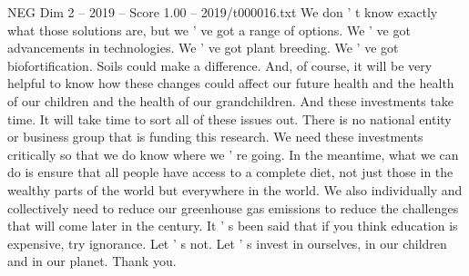\begin{textsample}{NEG Dim 2 – 2019 – Score 1.00 – 2019/t000016.txt}
We don ' t know exactly what those solutions are, but we ' ve got a range of options.
We ' ve got advancements in technologies.
We ' ve got plant breeding.
We ' ve got biofortification.
Soils could make a difference.
And, of course, it will be very helpful to know how these changes could affect our future health and the health of our children and the health of our grandchildren.
And these investments take time.
It will take time to sort all of these issues out.
There is no national entity or business group that is funding this research.
We need these investments critically so that we do know where we ' re going.
In the meantime, what we can do is ensure that all people have access to a complete diet, not just those in the wealthy parts of the world but everywhere in the world.
We also individually and collectively need to reduce our greenhouse gas emissions to reduce the challenges that will come later in the century.
It ' s been said that if you think education is expensive, try ignorance.
Let ' s not.
Let ' s invest in ourselves, in our children and in our planet.
Thank you.

\end{textsample}
